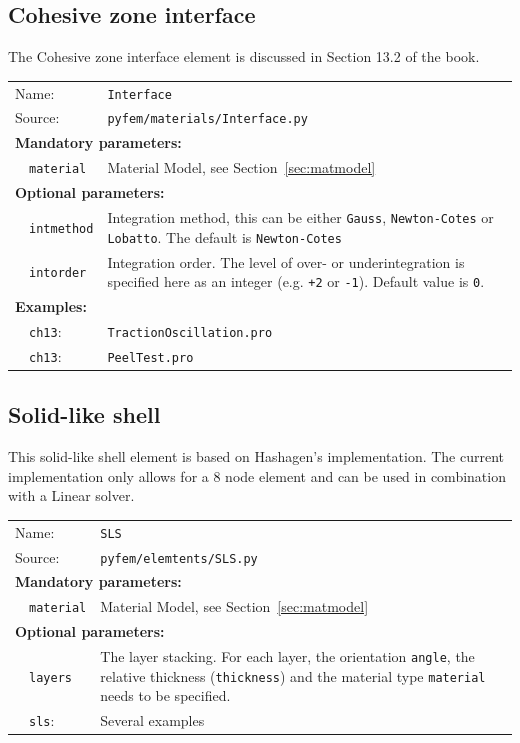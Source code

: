 \documentclass{article}
\begin{document}
\subsection{Cohesive zone interface}

The Cohesive zone interface element is discussed in Section 13.2 of the book.

\vspace{2mm}
\begin{tabular}{p{22mm}p{74mm}}
Name:         & \texttt{Interface} \\
Source:  & \texttt{pyfem/materials/Interface.py} \\
\multicolumn{2}{l}{\textbf{Mandatory parameters:}} \\
~~\texttt{material} & Material Model, see Section~\ref{sec:matmodel} \\
\multicolumn{2}{l}{\textbf{Optional parameters:}} \\ 
~~\texttt{intmethod}  & Integration method, this can be either \texttt{Gauss}, \texttt{Newton-Cotes} or \texttt{Lobatto}. The default is \texttt{Newton-Cotes}\\
~~\texttt{intorder}   & Integration order. The level of over- or underintegration is specified here as an integer (e.g. \texttt{+2} or \texttt{-1}). Default value is \texttt{0}.\\
\multicolumn{2}{l}{\textbf{Examples:}}\\
~~\texttt{ch13}: & \texttt{TractionOscillation.pro}\\
~~\texttt{ch13}: & \texttt{PeelTest.pro}
\end{tabular}

\subsection{Solid-like shell}

This solid-like shell element is based on Hashagen's implementation. The current
implementation only allows for a 8 node element and can be used in combination 
with a Linear solver.

\vspace{2mm}
\begin{tabular}{p{22mm}p{74mm}}
Name:         & \texttt{SLS} \\
Source:  & \texttt{pyfem/elemtents/SLS.py} \\
\multicolumn{2}{l}{\textbf{Mandatory parameters:}} \\
~~\texttt{material} & Material Model, see Section~\ref{sec:matmodel} \\
\multicolumn{2}{l}{\textbf{Optional parameters:}} \\ 
~~\texttt{layers}  & The layer stacking. For each layer, the orientation \texttt{angle}, the
 relative thickness (\texttt{thickness}) and the material type \texttt{material} needs to be specified.\\
~~\texttt{sls}: & Several examples
\end{tabular}
\end{document}
